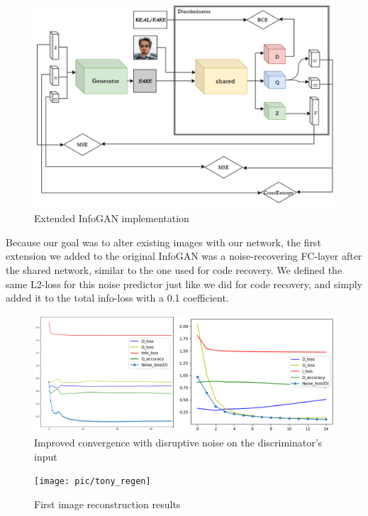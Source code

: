 \documentclass{egpubl}
\begin{document}
\begin{figure}[!htb]
	\centering
	\includegraphics[width=\linewidth]{pic/Infogan_diss_predicting}
	\caption{Extended InfoGAN implementation}
	\label{fig:infogan_simple_noise}
\end{figure}



Because our goal was to alter existing images with our network, the first extension we added to the original InfoGAN was a noise-recovering FC-layer after the shared network, similar to the one used for code recovery. We defined the same L2-loss for this noise predictor just like we did for code recovery, and simply added it to the total info-loss with a 0.1 coefficient.



\begin{figure}[!htb]
	\centering
	\includegraphics[width=\linewidth]{pic/added_noise2}
	\caption{Improved convergence with disruptive noise on the discriminator's input}
	\label{fig:added_noise}
\end{figure}

\begin{figure}[!htb]
	\centering
	\texttt{[image: pic/tony\_regen]}
	\caption{First image reconstruction results}
	\label{fig:tony_regen}
\end{figure}
\end{document}
